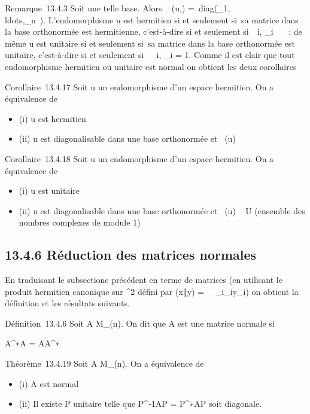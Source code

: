 \documentclass[]{article}
\begin{document}
Remarque~13.4.3 Soit  une telle base. Alors
\mathrmMat~ (u,)
=\
diag(\lambda_1,\\ldots,\lambda_n~).
L'endomorphisme u est hermitien si et seulement si~sa matrice dans la
base orthonormée \mathcal{E} est hermitienne, c'est-à-dire si et seulement
si~\forall~i, \lambda_i~ \in \mathbb{R}~~; de même u est
unitaire si et seulement si~sa matrice dans la base orthonormée  est
unitaire, c'est-à-dire si et seulement si~\forall~~i,
\lambda_i = 1. Comme il est clair que tout
endomorphisme hermitien ou unitaire est normal on obtient les deux
corollaires

Corollaire~13.4.17 Soit u un endomorphisme d'un espace hermitien. On a
équivalence de

\begin{itemize}
\itemsep1pt\parskip0pt
\item
  (i) u est hermitien
\item
  (ii) u est diagonalisable dans une base orthonormée et
  ~(u) \subset~ ~
\end{itemize}

Corollaire~13.4.18 Soit u un endomorphisme d'un espace hermitien. On a
équivalence de

\begin{itemize}
\itemsep1pt\parskip0pt
\item
  (i) u est unitaire
\item
  (ii) u est diagonalisable dans une base orthonormée et
  ~(u) \subset~ U
  (ensemble des nombres complexes de module 1)
\end{itemize}

\subsection{13.4.6 Réduction des matrices normales}

En traduisant le subsectione précédent en terme de matrices (en utilisant
le produit hermitien canonique sur \mathbb{C}^2 défini par
(x∣y) =\
\sum ~
_i\overlinex_iy_i) on
obtient la définition et les résultats suivants.

Définition~13.4.6 Soit A \in M_(n). On dit que A est une matrice
normale si

A^∗A = AA^∗

Théorème~13.4.19 Soit A \in M_(n). On a équivalence de

\begin{itemize}
\itemsep1pt\parskip0pt
\item
  (i) A est normal
\item
  (ii) Il existe P unitaire telle que P^-1AP =
  P^∗AP soit diagonale.
\end{itemize}
\end{document}
